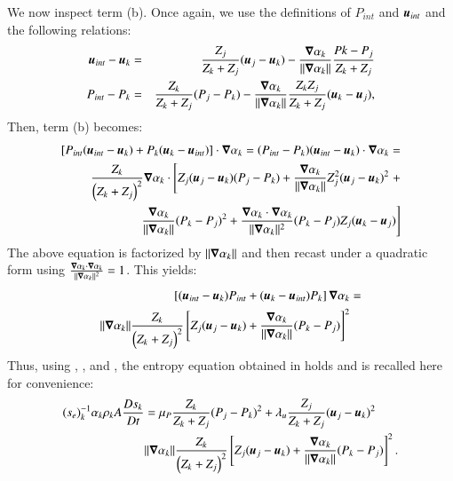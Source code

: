 \documentclass[preprint,10pt]{elsarticle}
\begin{document}
\begin{appendices}
We now inspect term (b). Once again, we use the definitions of $P_{int}$ and $\boldsymbol u_{int}$ and the following relations:
\begin{eqnarray}
\label{eq:ent4bis}
\boldsymbol u_{int}-\boldsymbol u_k &=& \frac{Z_j}{Z_k+Z_j}(\boldsymbol u_j-\boldsymbol u_k) -  \frac{\boldsymbol\nabla \alpha_k}{\| \boldsymbol\nabla \alpha_k \|} \frac{Pk-P_j}{Z_k+Z_j} \nonumber\\
P_{int}-P_k &=& \frac{Z_k}{Z_k+Z_j} (P_j-P_k) - \frac{\boldsymbol\nabla \alpha_k}{\| \boldsymbol\nabla \alpha_k \|} \frac{Z_k Z_j}{Z_k+Z_j} (\boldsymbol u_k-\boldsymbol u_j), \nonumber 
\end{eqnarray}
Then, term (b) becomes:
\begin{eqnarray}
\label{eq:ent5}
\left[ P_{int} (\boldsymbol u_{int}-\boldsymbol u_k) + P_k (\boldsymbol u_k-\boldsymbol u_{int}) \right] \cdot \boldsymbol\nabla \alpha_k = (P_{int}-P_k)(\boldsymbol u_{int}-\boldsymbol u_k)\cdot \boldsymbol\nabla \alpha_k=  \nonumber\\ 
\frac{Z_k}{\left( Z_k+Z_j \right)^2} \boldsymbol\nabla \alpha_k \cdot \left[ Z_j (\boldsymbol u_j-\boldsymbol u_k)(P_j-P_k)+\frac{\boldsymbol\nabla \alpha_k}{\| \boldsymbol\nabla \alpha_k \|} Z_j^2 (\boldsymbol u_j-\boldsymbol u_k)^2 \right. + \nonumber \\ 
\left. \frac{\boldsymbol\nabla \alpha_k}{\| \boldsymbol\nabla \alpha_k \|}(P_k-P_j)^2 +  \frac{\boldsymbol\nabla \alpha_k \cdot \boldsymbol\nabla \alpha_k}{\| \boldsymbol\nabla \alpha_k \|^2}(P_k-P_j)Z_j (\boldsymbol u_k-\boldsymbol u_j) \right] 
\end{eqnarray}
The above equation is factorized by $\|  \boldsymbol\nabla \alpha_k \|$ and then recast under a quadratic form using $\frac{\boldsymbol\nabla \alpha_k \cdot \boldsymbol\nabla \alpha_k}{\| \boldsymbol\nabla \alpha_k \|^2} = 1$. This yields:
\begin{align}
\label{eq:ent6}
\left[ (\boldsymbol u_{int}-\boldsymbol u_k)P_{int} + (\boldsymbol u_k-\boldsymbol u_{int})P_k \right] \boldsymbol\nabla \alpha_k &=  \nonumber \\
\| \boldsymbol\nabla \alpha_k \| \frac{Z_k }{\left( Z_k+Z_j \right)^2} \left[ Z_j (\boldsymbol u_j-\boldsymbol u_k) + \frac{\boldsymbol\nabla \alpha_k}{\| \boldsymbol\nabla \alpha_k \|}(P_k-P_j)\right]^2
\end{align}
Thus, using , ,  and , the entropy equation obtained in \cite{SEM} holds and is recalled here for convenience:
\begin{align}
(s_{e})_k^{-1} \alpha_k \rho_k A \frac{Ds_k}{Dt} &= \mu_P \frac{Z_k}{Z_k+Z_j} (P_j - P_k)^2 + \lambda_u \frac{Z_j}{Z_k+Z_j} (\boldsymbol u_j -\boldsymbol u_k)^2 \nonumber
\\
& \| \boldsymbol\nabla \alpha_k \| \frac{Z_k}{\left( Z_k+Z_j \right)^2} \left[ Z_j (\boldsymbol u_j-\boldsymbol u_k)+\frac{\boldsymbol\nabla \alpha_k}{\| \boldsymbol\nabla \alpha_k \|}(P_k-P_j)\right]^2. \nonumber
\end{align}


\end{appendices}
\end{document}
